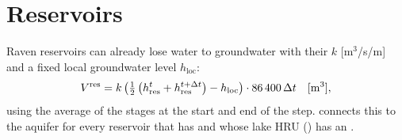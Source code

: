 \section{Reservoirs}\label{ch:reservoirs}
Raven reservoirs can already lose water to groundwater with their  $k$ [m$^3$/s/m] and a fixed
local groundwater level $h_{\mathrm{loc}}$:
\begin{equation}
V^{\mathrm{res}}=k\left(\tfrac12\left(h^{t}_{\mathrm{res}}+h^{t+\Delta t}_{\mathrm{res}}\right)-h_{\mathrm{loc}}\right)\cdot86\,400\,\Delta t
\quad[\mathrm{m}^3],
\end{equation}
using the average of the stages at the start and end of the step.  connects this to the aquifer
for every reservoir that has  and whose lake HRU () has an .

